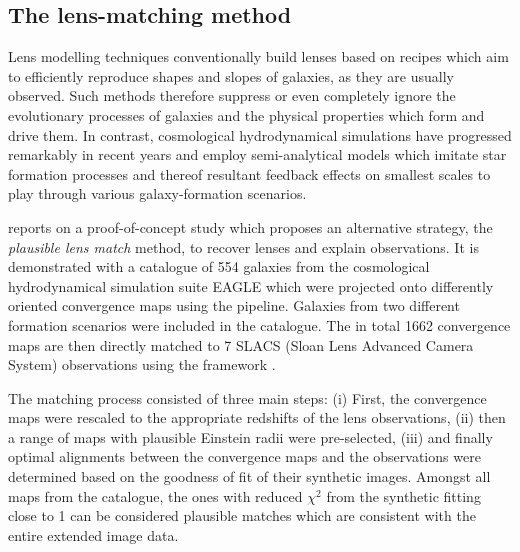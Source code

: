 \subsection{The lens-matching method}

Lens modelling techniques conventionally build lenses based on recipes which aim
to efficiently reproduce shapes and slopes of galaxies, as they are usually
observed.  Such methods therefore suppress or even completely ignore the
evolutionary processes of galaxies and the physical properties which form and
drive them.  In contrast, cosmological hydrodynamical simulations have
progressed remarkably in recent years and employ semi-analytical models which
imitate star formation processes and thereof resultant feedback effects on
smallest scales to play through various galaxy-formation scenarios.

 reports on a proof-of-concept study which proposes an alternative
strategy, the \textit{plausible lens match} method, to recover lenses and
explain observations.  It is demonstrated with a catalogue of 554 galaxies from
the cosmological hydrodynamical simulation suite EAGLE which were projected onto
differently oriented convergence maps using the  pipeline.  
Galaxies from two different formation scenarios were included in the catalogue.
The in total 1662 convergence maps are then directly matched to 7 SLACS (Sloan Lens
Advanced Camera System) observations using the  framework
\cite{gleam}. 

The matching process consisted of three main steps: (i) First, the convergence
maps were rescaled to the appropriate redshifts of the lens observations, (ii)
then a range of maps with plausible Einstein radii were pre-selected, (iii) and
finally optimal alignments between the convergence maps and the observations
were determined based on the goodness of fit of their synthetic images.  Amongst
all maps from the catalogue, the ones with reduced $\chi^{2}$ from the synthetic
fitting close to 1 can be considered plausible matches which are consistent with
the entire extended image data.

